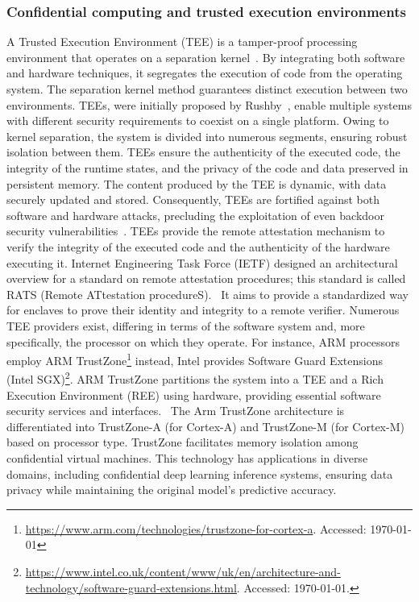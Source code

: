 \begin{newj}
\subsubsection{Confidential computing and trusted execution environments}
\label{sec:background:tee}
A Trusted Execution Environment (TEE) is a tamper-proof processing environment that operates on a separation kernel~\citep{mcgillion2015open}. By integrating both software and hardware techniques, it segregates the execution of code from the operating system. The separation kernel method guarantees distinct execution between two environments.
TEEs, were initially proposed by Rushby~\citet{rushby1981design}, enable multiple systems with different security requirements to coexist on a single platform. Owing to kernel separation, the system is divided into numerous segments, ensuring robust isolation between them.
TEEs ensure the authenticity of the executed code, the integrity of the runtime states, and the privacy of the code and data preserved in persistent memory. The content produced by the TEE is dynamic, with data securely updated and stored. Consequently, TEEs are fortified against both software and hardware attacks, precluding the exploitation of even backdoor security vulnerabilities~\citep{DBLP:conf/trustcom/SabtAB15}. TEEs provide the remote attestation mechanism to verify the integrity of the executed code and the authenticity of the hardware executing it. Internet Engineering Task Force (IETF) designed an architectural overview for a standard on remote attestation procedures; this standard is called RATS (Remote ATtestation procedureS).~\cite{rfc9334} It aims to provide a standardized way for enclaves to prove their identity and integrity to a remote verifier. Numerous TEE providers exist, differing in terms of the software system and, more specifically, the processor on which they operate. For instance, ARM processors employ ARM TrustZone\footnote{\url{https://www.arm.com/technologies/trustzone-for-cortex-a}. Accessed: \today} instead, Intel provides Software Guard Extensions (Intel SGX)\footnote{\url{https://www.intel.co.uk/content/www/uk/en/architecture-and-technology/software-guard-extensions.html}. Accessed: \today.}.
ARM TrustZone partitions the system into a TEE and a Rich Execution Environment (REE) using hardware, providing essential software security services and 
interfaces.~\cite{DBLP:journals/corr/abs-2306-11011} The Arm TrustZone architecture is differentiated into TrustZone-A (for Cortex-A) and TrustZone-M (for Cortex-M) based on processor type. TrustZone facilitates memory isolation among confidential virtual machines.\cite{DBLP:conf/cpsweek/SarkerITF23} This technology has applications in diverse domains, including confidential deep learning inference systems, ensuring data privacy while maintaining the original model's predictive accuracy.\cite{DBLP:conf/codaspy/IslamZKKH23}

\end{newj}
